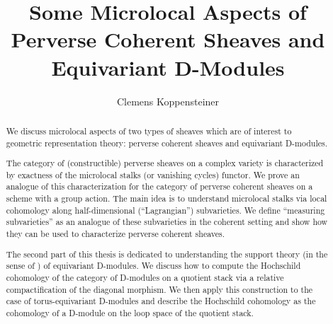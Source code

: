 \documentclass[english]{thesis}
\title{Some Microlocal Aspects of Perverse Coherent Sheaves and Equivariant D-Modules}
\author{Clemens Koppensteiner}
\begin{document}
\frontmatter

\maketitlepage

\begin{abstract}
    We discuss microlocal aspects of two types of sheaves which are of interest to geometric representation theory: perverse coherent sheaves and equivariant D-modules.

    The category of (constructible) perverse sheaves on a complex variety is characterized by exactness of the microlocal stalks (or vanishing cycles) functor.
    We prove an analogue of this characterization for the category of perverse coherent sheaves on a scheme with a group action.
    The main idea is to understand microlocal stalks via local cohomology along half-dimensional (\enquote{Lagrangian}) subvarieties.
    We define \enquote{measuring subvarieties} as an analogue of these subvarieties in the coherent setting and show how they can be used to characterize perverse coherent sheaves.

    The second part of this thesis is dedicated to understanding the support theory (in the sense of \cite{BensonIyengarKrause:2008:LocalCohomologyAndSupportForTriangulatedCategories}) of equivariant D-modules.
    We discuss how to compute the Hochschild cohomology of the category of D-modules on a quotient stack via a relative compactification of the diagonal morphism.
    We then apply this construction to the case of torus-equivariant D-modules and describe the Hochschild cohomology as the cohomology of a D-module on the loop space of the quotient stack.
\end{abstract}



\tableofcontents

\mainmatter





\backmatter

\printbibliography
\end{document}
